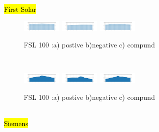 \documentclass[sigconf, nonacm]{acmart}
\begin{document}
\hl{First Solar}
\\
\begin{figure}
\caption{FSL 100 :a) postive b)negative c) compund}
\includegraphics[width=0.17\textwidth]{images/fslr_100_pos.png}
\includegraphics[width=0.17\textwidth]{images/fslr_100_neg.png}
\includegraphics[width=0.17\textwidth]{images/fslr_100_comp.png}
\end{figure}
\\
\begin{figure}
\caption{FSL 100 :a) postive b)negative c) compund}
\includegraphics[width=0.17\textwidth]{images/fslr_1000_pos.png}
\includegraphics[width=0.17\textwidth]{images/fslr_1000_neg.png}
\includegraphics[width=0.17\textwidth]{images/fslr_1000_comp.png}
\end{figure}
\\
\hl{Siemens}
\end{document}
